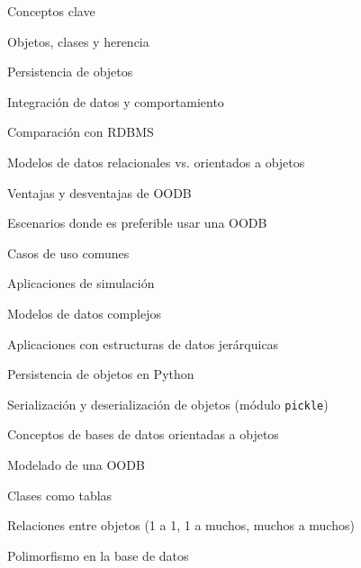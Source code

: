 \begin{longenum}
\begin{longenum}
\begin{longenum}
            \item Conceptos clave
            \begin{longenum}
                \item Objetos, clases y herencia
                \item Persistencia de objetos
                \item Integración de datos y comportamiento
            \end{longenum}
            \item Comparación con RDBMS
            \begin{longenum}
                \item Modelos de datos relacionales vs. orientados a objetos
                \item Ventajas y desventajas de OODB
                \item Escenarios donde es preferible usar una OODB
            \end{longenum}
            \item Casos de uso comunes
            \begin{longenum}
                \item Aplicaciones de simulación
                \item Modelos de datos complejos
                \item Aplicaciones con estructuras de datos jerárquicas
            \end{longenum}
        \end{longenum}
        \item Persistencia de objetos en Python
        \begin{longenum}
            \item Serialización y deserialización de objetos (módulo \texttt{pickle})
        \end{longenum}
        \item Conceptos de bases de datos orientadas a objetos
        \begin{longenum}
            \item Modelado de una OODB
            \begin{longenum}
                \item Clases como tablas
                \item Relaciones entre objetos (1 a 1, 1 a muchos, muchos a muchos)
                \item Polimorfismo en la base de datos
            \end{longenum}

\end{longenum}
\end{longenum}
\end{longenum}
